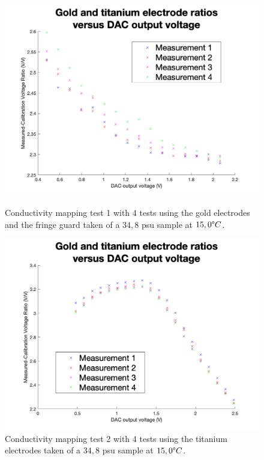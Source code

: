 \begin{figure}[ht]
    \begin{minipage}{0.5\textwidth}
        \centering
        \includegraphics[width=\textwidth]{Figures/Testing/Aus16}
        \caption{Conductivity mapping test 1 with 4 tests using the gold electrodes and the fringe guard taken of a $34,8$ \gls{psu} sample at $15,0\degree C$.}
        \label{fig:test9} %
    \end{minipage}
    \begin{minipage}{0.5\textwidth}
        \centering
        \includegraphics[width=\textwidth]{Figures/Testing/Ti16}
        \caption{Conductivity mapping test 2 with 4 tests using the titanium electrodes taken of a $34,8$ \gls{psu} sample at $15,0\degree C$.}
        \label{fig:test10} %
    \end{minipage}
\end{figure}

